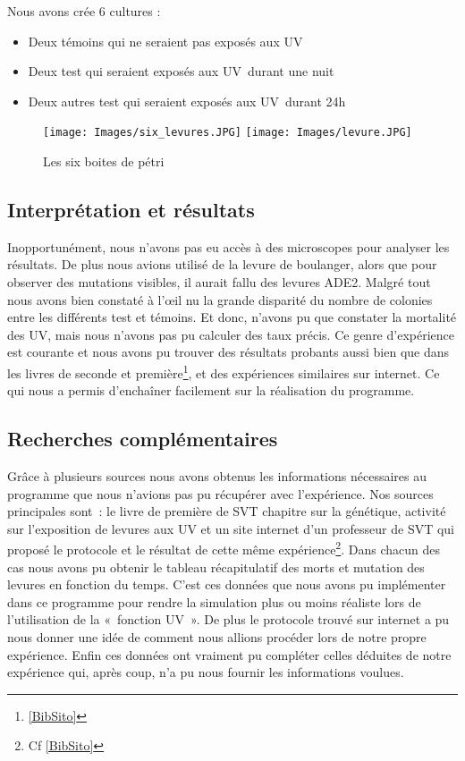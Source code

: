     Nous avons crée 6 cultures : 
    \begin{itemize}
      \item Deux témoins qui ne seraient pas exposés aux UV
      \item Deux test qui seraient exposés aux UV durant une nuit
      \item Deux autres test qui seraient exposés aux UV durant 24h
    \end{itemize}
    
    \begin{figure}[H]
			\begin{center}
				\texttt{[image: Images/six\_levures.JPG]}
				\texttt{[image: Images/levure.JPG]}
			\end{center}
			\caption{Les six boites de pétri}
		\end{figure}


\subsection{Interprétation et résultats}
  Inopportunément, nous n'avons pas eu accès à des microscopes pour analyser les résultats. De plus nous avions utilisé de la levure de boulanger, alors que pour observer des mutations visibles, il aurait fallu des levures ADE2. Malgré tout nous avons bien constaté à l'œil nu la grande disparité du nombre de colonies entre les différents test et témoins. Et donc, n'avons pu que constater la mortalité des UV, mais nous n'avons pas pu calculer des taux précis.
  Ce genre d'expérience est courante et nous avons pu trouver des résultats probants aussi bien que dans les livres de seconde et première\footnote{\ref{BibSito}}, et des expériences similaires sur internet. Ce qui nous a permis d'enchaîner facilement sur la réalisation du programme.

\subsection{Recherches complémentaires}
  Grâce à plusieurs sources nous avons obtenus les informations nécessaires au programme que nous n’avions pas pu récupérer avec l’expérience. Nos sources principales sont : le livre de première de SVT chapitre sur la génétique, activité sur l’exposition de levures aux UV et un site internet d’un professeur de SVT qui proposé le protocole et le résultat de cette même expérience\footnote{Cf \ref{BibSito}}. Dans chacun des cas nous avons pu obtenir le tableau récapitulatif des morts et mutation des levures en fonction du temps. C’est ces données que nous avons pu implémenter dans ce programme pour rendre la simulation plus ou moins réaliste lors de l’utilisation de la « fonction UV ». De plus le protocole trouvé sur internet a pu nous donner une idée de comment nous allions procéder lors de notre propre expérience. Enfin ces données ont vraiment pu compléter celles déduites de notre expérience qui, après coup, n’a pu nous fournir les informations voulues.
  
